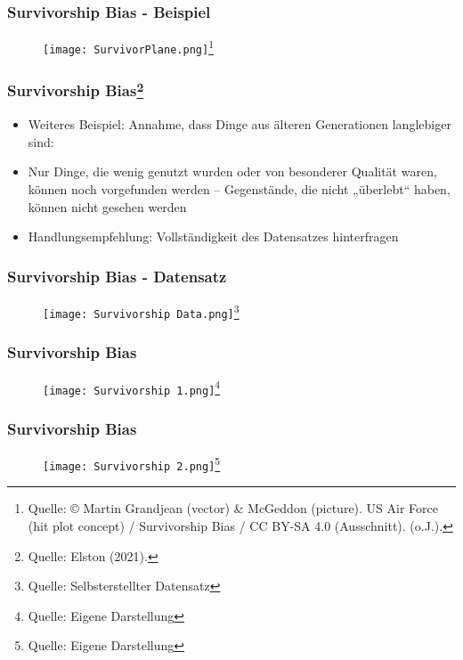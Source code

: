 \documentclass{beamer}
\begin{document}
\begin{frame}
\frametitle{Survivorship Bias - Beispiel}

\begin{figure}
    \centering
    \texttt{[image: SurvivorPlane.png]}\footnote{Quelle: {© Martin Grandjean (vector) & McGeddon (picture). US Air Force (hit plot concept) / Survivorship Bias / CC BY-SA 4.0 (Ausschnitt). (o.J.).}}
    
\end{figure}

\end{frame}

\begin{frame}
\frametitle{Survivorship Bias\footnote{Quelle: {Elston (2021).}}}
\begin{itemize}
    \item Weiteres Beispiel: Annahme, dass Dinge aus älteren Generationen langlebiger sind:
    \item Nur Dinge, die wenig genutzt wurden oder von besonderer Qualität waren, können noch vorgefunden werden – Gegenstände, die nicht „überlebt“ haben, können nicht gesehen werden
    \item Handlungsempfehlung: Vollständigkeit des Datensatzes hinterfragen
    
\end{itemize}
\end{frame}

\begin{frame}
\frametitle{Survivorship Bias - Datensatz}

\begin{figure}
    \centering
    \texttt{[image: Survivorship Data.png]}\footnote{Quelle: {Selbsterstellter Datensatz}}
    
\end{figure}

\end{frame}

\begin{frame}
\frametitle{Survivorship Bias}

\begin{figure}
    \centering
    \texttt{[image: Survivorship 1.png]}\footnote{Quelle: {Eigene Darstellung}}
    
\end{figure}

\end{frame}

\begin{frame}
\frametitle{Survivorship Bias}

\begin{figure}
    \centering
    \texttt{[image: Survivorship 2.png]}\footnote{Quelle: {Eigene Darstellung}}
    
\end{figure}

\end{frame}
\end{document}
